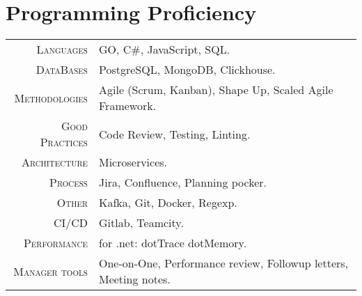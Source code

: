 \documentclass[a4paper,11pt]{article}
\begin{document}
\section{Programming Proficiency}
\begin{tabular}{rl}
  \textsc{Languages}& GO, C\#, JavaScript, SQL.\\
  \textsc{DataBases}& PostgreSQL, MongoDB, Clickhouse.\\ %
  \textsc{Methodologies}& Agile (Scrum, Kanban), Shape Up, Scaled Agile Framework.\\
  \textsc{Good Practices}& Code Review, Testing, Linting.\\
  \textsc{Architecture}& Microservices.\\
  \textsc{Process}& Jira, Confluence, Planning pocker.\\
  \textsc{Other}& Kafka, Git, Docker, Regexp.\\
  \textsc{CI/CD}& Gitlab, Teamcity. \\
  \textsc{Performance}& for .net: dotTrace dotMemory.\\
  \textsc{Manager tools}& One-on-One, Performance review, Followup letters, Meeting notes.\\
  
  
  

\end{tabular}
\end{document}

